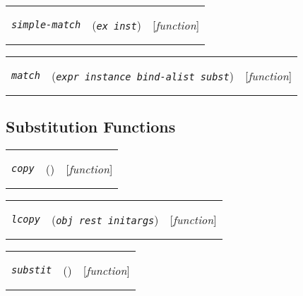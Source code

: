 \documentclass[12pt]{book}
\makeatletter
\def\amprest{{\smaller\sc {\smaller\smaller \&}rest\ }}
\newenvironment{function}[3]%
{\par\noindent\begin{boxedminipage}{\textwidth}%
 \par\noindent\begin{tabularx}{\linewidth}{l>{\raggedright}Xr}%
 \functionhtgt{#1}&(\texttt{\textit{#2}})&[\emph{#3}]%
 \end{tabularx}\par\flushright\begin{minipage}{.97\textwidth}}
{\end{minipage}\end{boxedminipage}}
\newcommand{\functionnm}[1]{\texttt{\textit{#1}}}
\newcommand{\functionhtgt}[1]{\hypertarget{#1}{\functionnm{#1}}\index{#1@\functionnm{#1}|underline}}
\newenvironment{lispfunction}[2]%
{\begin{function}{#1}{#2}{function}}{\end{function}}
\makeatother
\begin{document}
\begin{lispfunction}{simple-match}{ex inst}
\end{lispfunction}

\begin{lispfunction}{match}{expr instance bind-alist subst}
\end{lispfunction}


\subsection{Substitution Functions}

\begin{lispfunction}{copy}{}
\end{lispfunction}

\begin{lispfunction}{lcopy}{obj \amprest initargs}
\end{lispfunction}

\begin{lispfunction}{substit}{}
\end{lispfunction}
\end{document}
